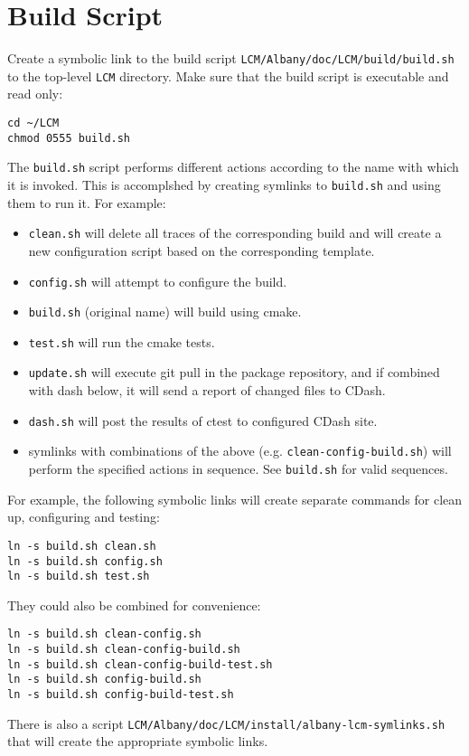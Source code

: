 \documentclass{article}
\begin{document}
\section{Build Script}
Create a symbolic link to the build script
\verb+LCM/Albany/doc/LCM/build/build.sh+ to the top-level \verb+LCM+
directory. Make sure that the build script is executable and
read only:
\begin{verbatim}
cd ~/LCM
chmod 0555 build.sh
\end{verbatim}

The \verb+build.sh+ script performs different actions according to the name with
which it is invoked. This is accomplshed by creating symlinks to \verb+build.sh+
and using them to run it. For example:
\begin{itemize}
\item \verb+clean.sh+ will delete all traces of the corresponding build and will
  create a new configuration script based on the corresponding template.

\item \verb+config.sh+ will attempt to configure the build.

\item \verb+build.sh+ (original name) will build using cmake.

\item \verb+test.sh+ will run the cmake tests.

\item \verb+update.sh+ will execute git pull in the package repository, and if
  combined with dash below, it will send a report of changed files to CDash.

\item \verb+dash.sh+ will post the results of ctest to configured CDash site.

\item symlinks with combinations of the above
  (e.g. \verb+clean-config-build.sh+) will perform the specified actions in
  sequence. See \verb+build.sh+ for valid sequences.
\end{itemize}
For example, the following symbolic links will create separate
commands for clean up, configuring and testing:
\begin{verbatim}
ln -s build.sh clean.sh
ln -s build.sh config.sh
ln -s build.sh test.sh
\end{verbatim}
They could also be combined for convenience:
\begin{verbatim}
ln -s build.sh clean-config.sh
ln -s build.sh clean-config-build.sh
ln -s build.sh clean-config-build-test.sh
ln -s build.sh config-build.sh
ln -s build.sh config-build-test.sh
\end{verbatim}
There is also a script
\verb+LCM/Albany/doc/LCM/install/albany-lcm-symlinks.sh+
that will create the appropriate symbolic links.
\end{document}
